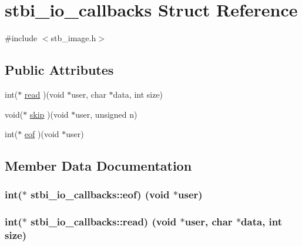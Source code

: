 \hypertarget{structstbi__io__callbacks}{}\section{stbi\+\_\+io\+\_\+callbacks Struct Reference}
\label{structstbi__io__callbacks}


{\ttfamily \#include $<$stb\+\_\+image.\+h$>$}

\subsection*{Public Attributes}
\begin{DoxyCompactItemize}
\item 
int($\ast$ \hyperlink{structstbi__io__callbacks_a623e46b3a2a019611601409926283a88}{read} )(void $\ast$user, char $\ast$data, int size)
\item 
void($\ast$ \hyperlink{structstbi__io__callbacks_aedb03a587afc3bffe28979c4e1b981bd}{skip} )(void $\ast$user, unsigned n)
\item 
int($\ast$ \hyperlink{structstbi__io__callbacks_a319639db2f76e715eed7a7a974136832}{eof} )(void $\ast$user)
\end{DoxyCompactItemize}


\subsection{Member Data Documentation}
\hypertarget{structstbi__io__callbacks_a319639db2f76e715eed7a7a974136832}{}
\subsubsection[{eof}]{\setlength{\rightskip}{0pt plus 5cm}int($\ast$ stbi\+\_\+io\+\_\+callbacks\+::eof) (void $\ast$user)}\label{structstbi__io__callbacks_a319639db2f76e715eed7a7a974136832}
\hypertarget{structstbi__io__callbacks_a623e46b3a2a019611601409926283a88}{}
\subsubsection[{read}]{\setlength{\rightskip}{0pt plus 5cm}int($\ast$ stbi\+\_\+io\+\_\+callbacks\+::read) (void $\ast$user, char $\ast$data, int size)}\label{structstbi__io__callbacks_a623e46b3a2a019611601409926283a88}
\hypertarget{structstbi__io__callbacks_aedb03a587afc3bffe28979c4e1b981bd}{}
